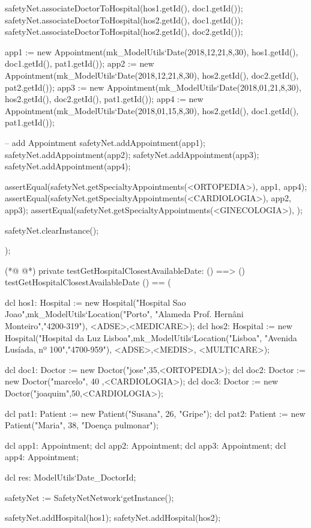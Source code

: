 \begin{vdmpp}[breaklines=true]
  safetyNet.associateDoctorToHospital(hos1.getId(), doc1.getId());
  safetyNet.associateDoctorToHospital(hos2.getId(), doc1.getId());
  safetyNet.associateDoctorToHospital(hos2.getId(), doc2.getId());

  app1 := new Appointment(mk_ModelUtils`Date(2018,12,21,8,30), hos1.getId(), doc1.getId(), pat1.getId());
  app2 := new Appointment(mk_ModelUtils`Date(2018,12,21,8,30), hos2.getId(), doc2.getId(), pat2.getId());
  app3 := new Appointment(mk_ModelUtils`Date(2018,01,21,8,30), hos2.getId(), doc2.getId(), pat1.getId());
  app4 := new Appointment(mk_ModelUtils`Date(2018,01,15,8,30), hos2.getId(), doc1.getId(), pat1.getId());
    
  -- add Appointment
  safetyNet.addAppointment(app1);
  safetyNet.addAppointment(app2);
  safetyNet.addAppointment(app3);
  safetyNet.addAppointment(app4);
  
  assertEqual(safetyNet.getSpecialtyAppointments(<ORTOPEDIA>), {app1, app4});
  assertEqual(safetyNet.getSpecialtyAppointments(<CARDIOLOGIA>), {app2, app3});
  assertEqual(safetyNet.getSpecialtyAppointments(<GINECOLOGIA>), {});
  
  
  safetyNet.clearInstance();
    
);

(*@
\label{testGetHospitalClosestAvailableDate:904}
@*)
private testGetHospitalClosestAvailableDate: () ==> ()
 testGetHospitalClosestAvailableDate () == (
 
  dcl hos1: Hospital := new Hospital("Hospital Sao Joao",mk_ModelUtils`Location("Porto", "Alameda Prof. Hernâni Monteiro","4200-319"), {<ADSE>,<MEDICARE>});
  dcl hos2: Hospital := new Hospital("Hospital da Luz Lisboa",mk_ModelUtils`Location("Lisboa", "Avenida Lusíada, nº 100","4700-959"), {<ADSE>,<MEDIS>, <MULTICARE>});
  
  dcl doc1: Doctor := new Doctor("jose",35,<ORTOPEDIA>);
  dcl doc2: Doctor := new Doctor("marcelo", 40 ,<CARDIOLOGIA>);
  dcl doc3: Doctor := new Doctor("joaquim",50,<CARDIOLOGIA>);
  
  dcl pat1: Patient := new Patient("Susana", 26, "Gripe");
  dcl pat2: Patient := new Patient("Maria", 38, "Doença pulmonar");
  
  dcl app1: Appointment;
  dcl app2: Appointment;
  dcl app3: Appointment;
  dcl app4: Appointment;
  
  dcl res: ModelUtils`Date_DoctorId;
  
  safetyNet := SafetyNetNetwork`getInstance();
   
  safetyNet.addHospital(hos1);
  safetyNet.addHospital(hos2);
  

\end{vdmpp}
